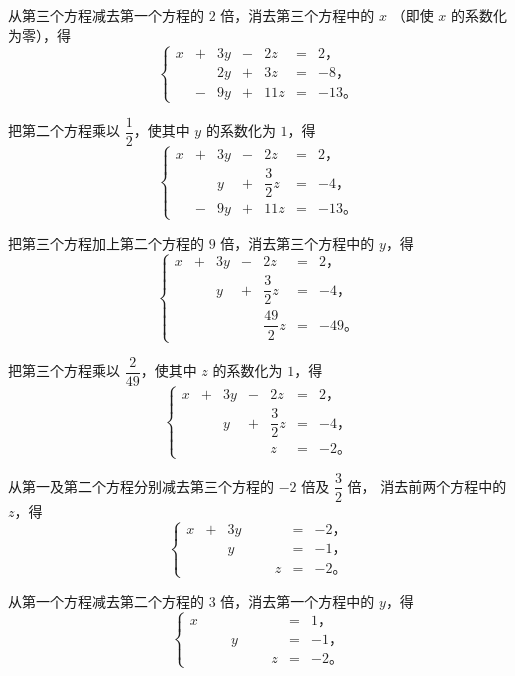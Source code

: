 从第三个方程减去第一个方程的 $2$ 倍，消去第三个方程中的 $x$
（即使 $x$ 的系数化为零），得
$$\left\{
    \begin{alignedat}{4}
        x  & +{} & 3y & -{} &  2z & ={} & 2 \text{，} \\
           &     & 2y & +{} &  3z & ={} & -8 \text{，} \\
           & -{} & 9y & +{} & 11z & ={} & -13 \text{。}
    \end{alignedat}
\right.$$

把第二个方程乘以 $\dfrac{1}{2}$，使其中 $y$ 的系数化为 $1$，得
$$\left\{
    \begin{alignedat}{4}
        x  & +{} & 3y & -{} &  2z & ={} & 2 \text{，} \\
           &     &  y & +{} & \dfrac{3}{2}z & ={} & -4 \text{，} \\
           & -{} & 9y & +{} & 11z & ={} & -13 \text{。}
    \end{alignedat}
\right.$$


把第三个方程加上第二个方程的 $9$ 倍，消去第三个方程中的 $y$，得
$$\left\{
    \begin{alignedat}{4}
        x  & +{} & 3y & -{} &  2z & ={} & 2 \text{，} \\
           &     &  y & +{} & \dfrac{3}{2}z & ={} & -4 \text{，} \\
           &     &    &     & \dfrac{49}{2}z & ={} & -49 \text{。}
    \end{alignedat}
\right.$$

把第三个方程乘以 $\dfrac{2}{49}$，使其中 $z$ 的系数化为 $1$，得
$$\left\{
    \begin{alignedat}{4}
        x  & +{} & 3y & -{} &  2z & ={} & 2 \text{，} \\
           &     &  y & +{} & \dfrac{3}{2}z & ={} & -4 \text{，} \\
           &     &    &     & z & ={} & -2 \text{。}
    \end{alignedat}
\right.$$

从第一及第二个方程分别减去第三个方程的 $-2$ 倍及 $\dfrac{3}{2}$ 倍，
消去前两个方程中的 $z$，得
$$\left\{
    \begin{alignedat}{4}
        x  & +{} & 3y &  &   & ={} & -2 \text{，} \\
           &     &  y & \phantom{={}} &   & ={} & -1 \text{，} \\
           &     &    &  & z & ={} & -2 \text{。}
    \end{alignedat}
\right.$$

从第一个方程减去第二个方程的 $3$ 倍，消去第一个方程中的 $y$，得
$$\left\{
    \begin{alignedat}{4}
        x  & \phantom{={}} &    &  &   & ={} & 1 \text{，} \\
           &     &  y & \phantom{={}} &   & ={} & -1 \text{，} \\
           &     &    &  & z & ={} & -2 \text{。}
    \end{alignedat}
\right.$$

